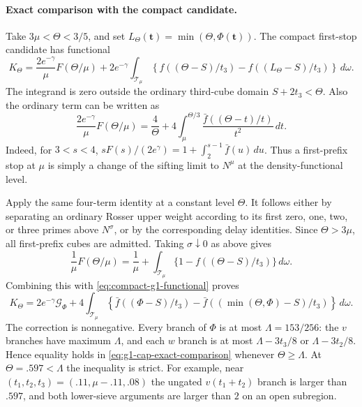 \documentclass[11pt]{article}
\begin{document}
\paragraph{Exact comparison with the compact candidate.}
Take $3\mu<\Theta<3/5$, and set
$L_\Theta(\boldsymbol t)=\min(\Theta,\Phi(\boldsymbol t))$.
The compact first-stop candidate has functional
\begin{equation}\label{eq:compact-g1-functional}
 K_\Theta=
 \frac{2e^{-\gamma}}\mu F(\Theta/\mu)
 +2e^{-\gamma}\int_{\mathcal T_\mu}
       \left\{f((\Theta-S)/t_3)
                    -f((L_\Theta-S)/t_3)\right\}\,d\omega.
\end{equation}
The integrand is zero outside the ordinary third-cube domain
$S+2t_3<\Theta$. Also the ordinary term can be written as
\begin{equation}\label{eq:first-stop-base-identity}
 \frac{2e^{-\gamma}}\mu F(\Theta/\mu)
 =\frac4\Theta+
   4\int_\mu^{\Theta/3}
       \frac{\bar f((\Theta-t)/t)}{t^2}\,dt.
\end{equation}
Indeed, for $3<s<4$,
$sF(s)/(2e^\gamma)=1+\int_2^{s-1}\bar f(u)\,du$.
Thus a first-prefix stop at $\mu$ is simply a change of the
sifting limit to $N^\mu$ at the density-functional level.

Apply the same four-term identity at a constant level $\Theta$.
It follows either by separating an ordinary Rosser upper weight
according to its first zero, one, two, or three primes above
$N^\sigma$, or by the corresponding delay identities. Since
$\Theta>3\mu$, all first-prefix cubes are admitted. Taking
$\sigma\downarrow0$ as above gives
\[
 \frac1\mu F(\Theta/\mu)
 =\frac1\mu+\int_{\mathcal T_\mu}
          \{1-f((\Theta-S)/t_3)\}\,d\omega.
\]
Combining this with \eqref{eq:compact-g1-functional} proves
\begin{equation}\label{eq:g1-cap-exact-comparison}
 K_\Theta=2e^{-\gamma}\mathcal G_\Phi+
 4\int_{\mathcal T_\mu}
       \left\{\bar f((\Phi-S)/t_3)
             -\bar f((\min(\Theta,\Phi)-S)/t_3)\right\}\,d\omega.
\end{equation}
The correction is nonnegative. Every branch of $\Phi$ is at most
$\Lambda=153/256$: the $v$ branches have maximum $\Lambda$, and
each $w$ branch is at most $\Lambda-3t_3/8$ or
$\Lambda-3t_2/8$. Hence equality holds in
\eqref{eq:g1-cap-exact-comparison} whenever $\Theta\ge\Lambda$.
At $\Theta=.597<\Lambda$ the inequality is strict. For example,
near $(t_1,t_2,t_3)=(.11,\mu-.11,.08)$ the ungated
$v(t_1+t_2)$ branch is larger than $.597$, and both lower-sieve
arguments are larger than $2$ on an open subregion.
\end{document}
